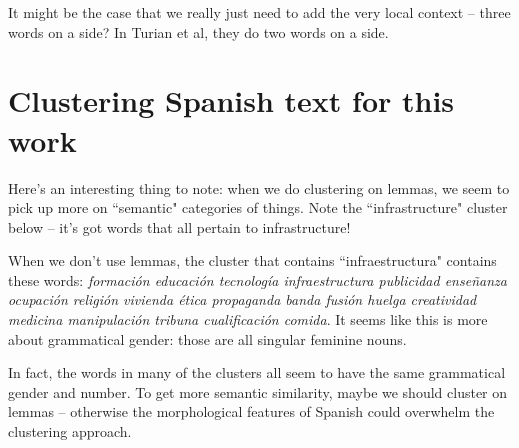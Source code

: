 It might be the case that we really just need to add the very local context --
three words on a side? In Turian et al, they do two words on a side.


\section{Clustering Spanish text for this work}


Here's an interesting thing to note: when we do clustering on lemmas, we seem
to pick up more on ``semantic" categories of things. Note the ``infrastructure"
cluster below -- it's got words that all pertain to infrastructure!

When we don't use lemmas, the cluster that contains ``infraestructura" contains
these words: \emph{formación educación tecnología infraestructura publicidad
enseñanza ocupación religión vivienda ética propaganda banda fusión huelga
creatividad medicina manipulación tribuna cualificación comida}. It seems like
this is more about grammatical gender: those are all singular feminine nouns.

In fact, the words in many of the clusters all seem to have the same
grammatical gender and number. To get more semantic similarity, maybe we should
cluster on lemmas -- otherwise the morphological features of Spanish could
overwhelm the clustering approach.

